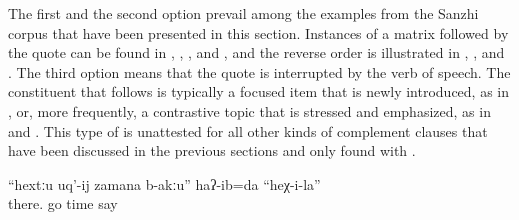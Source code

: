 The first and the second option prevail among the examples from the Sanzhi corpus that have been presented in this section. Instances of a matrix  followed by the quote can be found in , , , and , and the reverse order is illustrated in , , and . The third option means that the quote is interrupted by the verb of speech. The constituent that follows is typically a focused item that is newly introduced, as in , or, more frequently, a contrastive topic that is stressed and emphasized, as in  and . This type of  is unattested for all other kinds of complement clauses that have been discussed in the previous sections and only found with .
%
\begin{exe}
	\ex	\label{ex:I said, He does not have the time to go there}
	\gll	``hextːu	uq'-ij	zamana	b-akːu''	haʔ-ib=da 	``heχ-i-la''\\
		there.	go	time		say	\\
	\glt	{}
\end{exe}

